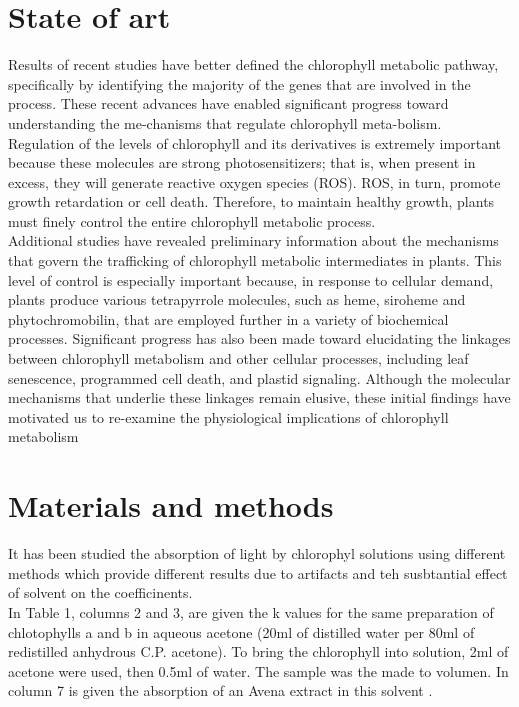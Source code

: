 \documentclass[a4paper, 11pt]{article}
\begin{document}
\section{State of art}
	Results of recent studies have better defined the chlorophyll metabolic pathway,\\ specifically by identifying the majority of the genes that are involved in the process. These recent advances have enabled significant progress toward understanding the me-chanisms that regulate chlorophyll meta-bolism. Regulation of the levels of chlorophyll and its derivatives is extremely important because these molecules are strong photosensitizers; that is, when present in excess, they will generate reactive oxygen species (ROS). ROS, in turn, promote\\ growth retardation or cell death. Therefore, to maintain healthy growth, plants must finely control the entire chlorophyll metabolic process.\\
	
	Additional studies have revealed preliminary information about the mechanisms that govern the trafficking of chlorophyll metabolic intermediates in plants. This level of control is especially important because, in response to cellular demand, plants produce various tetrapyrrole molecules, such as heme, siroheme and phytochromobilin, that are employed further in a variety of biochemical processes. Significant progress has also been made toward elucidating the linkages between chlorophyll metabolism and other cellular processes, including leaf senescence, programmed cell death, and plastid signaling. Although the molecular mechanisms that underlie these linkages remain elusive, these initial findings have motivated us to re-examine the physiological implications of chlorophyll metabolism \cite{Tanaka2006}

\section{Materials and methods}
	It has been studied the absorption of light by chlorophyl solutions using different methods which provide different results due to artifacts and teh susbtantial effect of solvent on the coefficinents. \\
	
	In Table 1, columns 2 and 3, are given the k values for the same preparation of chlotophylls a and b in aqueous acetone (20ml of distilled water per 80ml of redistilled anhydrous C.P. acetone). To bring the chlorophyll into solution, 2ml of acetone were used, then 0.5ml of water. The sample was the made to volumen. In column 7 is given the absorption of an Avena extract in this solvent \cite{Mackinney}.
	
\end{document}

